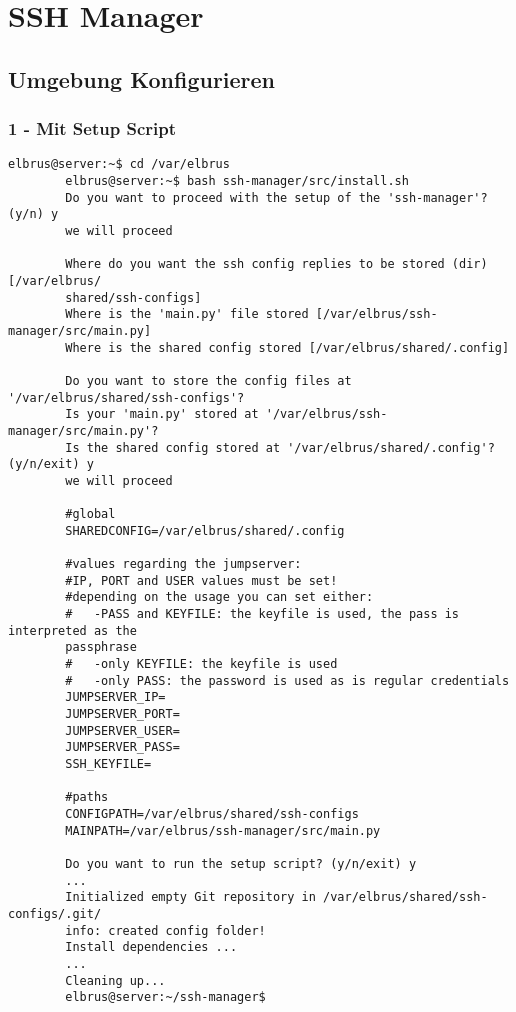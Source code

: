 \documentclass{article}
\begin{document}
	\section{SSH Manager}

	\subsection[file config]{Umgebung Konfigurieren}
	\lstset{style=files}
	\subsubsection{1 - Mit Setup Script}
	\lstset{style=commands}
	\begin{lstlisting}[caption={Ausführen des 'install.sh' Scripts.}]
		elbrus@server:~$ cd /var/elbrus
		elbrus@server:~$ bash ssh-manager/src/install.sh
		Do you want to proceed with the setup of the 'ssh-manager'? (y/n) y
		we will proceed
		
		Where do you want the ssh config replies to be stored (dir) [/var/elbrus/
		shared/ssh-configs]
		Where is the 'main.py' file stored [/var/elbrus/ssh-manager/src/main.py]
		Where is the shared config stored [/var/elbrus/shared/.config]
		
		Do you want to store the config files at '/var/elbrus/shared/ssh-configs'?
		Is your 'main.py' stored at '/var/elbrus/ssh-manager/src/main.py'?
		Is the shared config stored at '/var/elbrus/shared/.config'? (y/n/exit) y
		we will proceed
		
		#global
		SHAREDCONFIG=/var/elbrus/shared/.config
		
		#values regarding the jumpserver:
		#IP, PORT and USER values must be set!
		#depending on the usage you can set either:
		#   -PASS and KEYFILE: the keyfile is used, the pass is interpreted as the
		passphrase
		#   -only KEYFILE: the keyfile is used
		#   -only PASS: the password is used as is regular credentials
		JUMPSERVER_IP=
		JUMPSERVER_PORT=
		JUMPSERVER_USER=
		JUMPSERVER_PASS=
		SSH_KEYFILE=
		
		#paths
		CONFIGPATH=/var/elbrus/shared/ssh-configs
		MAINPATH=/var/elbrus/ssh-manager/src/main.py
		
		Do you want to run the setup script? (y/n/exit) y
		...
		Initialized empty Git repository in /var/elbrus/shared/ssh-configs/.git/
		info: created config folder!
		Install dependencies ...
		...
		Cleaning up...
		elbrus@server:~/ssh-manager$
	\end{lstlisting}
\end{document}
